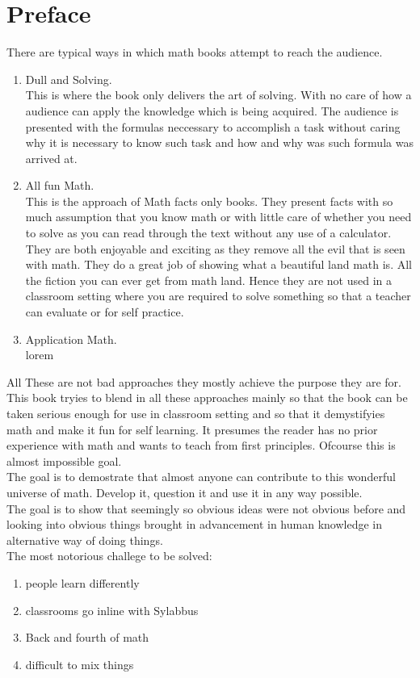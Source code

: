\chapter{Preface}
There are typical ways in which math books attempt to reach the audience.

\begin{enumerate}
      \item Dull and Solving.\\
            This is where the book only delivers the art of solving. With no care of how a audience can apply the knowledge which is being acquired. The audience is presented with the formulas neccessary to accomplish a task without caring why it is necessary to know such task and how and why was such formula was arrived at.
      \item All fun Math.\\
            This is the approach of Math facts only books. They present facts with so much assumption that you know math or with little care of whether you need to solve as you can read through the text without any use of a calculator. They are both enjoyable and exciting as they remove all the evil that is seen with math. They do a great job of showing what a beautiful land math is. All the fiction you can ever get from math land. Hence they are not used in a classroom setting where you are required to solve something so that a teacher can evaluate or for self practice.
      \item Application Math.\\
            lorem
\end{enumerate}
All These are not bad approaches they mostly achieve the purpose they are for.\\
This book tryies to blend in all these approaches mainly so that the book can be taken serious enough for use in classroom setting and so that it demystifyies math and make it fun for self learning. It presumes the reader has no prior experience with math and wants to teach from first principles. Ofcourse this is almost impossible goal. \\
The goal is to demostrate that almost anyone can contribute to this wonderful universe of math. Develop it, question it and use it in any way possible. \\
The goal is to show that seemingly so obvious ideas were not obvious before and looking into obvious things brought in advancement in human knowledge in alternative way of doing things.\\
The most notorious challege to be solved:
\begin{enumerate}
      \item people learn differently
      \item classrooms go inline with Sylabbus
      \item Back and fourth of math
      \item difficult to mix things
\end{enumerate}
\newpage